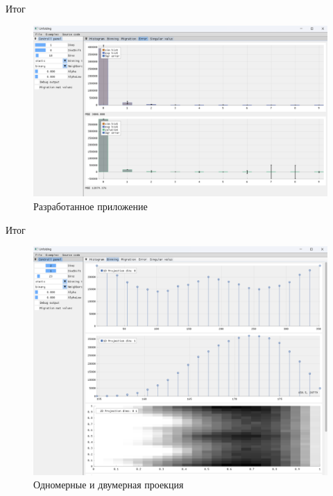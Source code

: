 \documentclass[fullscreen=true,russian,compress,%
	hyperref={unicode,bookmarks=false}]{presentation}
\begin{document}
\begin{frame}{Итог}
   \begin{figure}[h!]
      \centering
      \includegraphics[width=\linewidth]{images/app_example.png}
      \caption{Разработанное приложение}
   \end{figure}
\end{frame}

\begin{frame}{Итог}
   \begin{figure}[h!]
   \centering
   \includegraphics[scale=0.3]{images/binning_projections_example.png}
   \caption{Одномерные и двумерная проекция}
\end{figure}

\end{frame}
\end{document}
